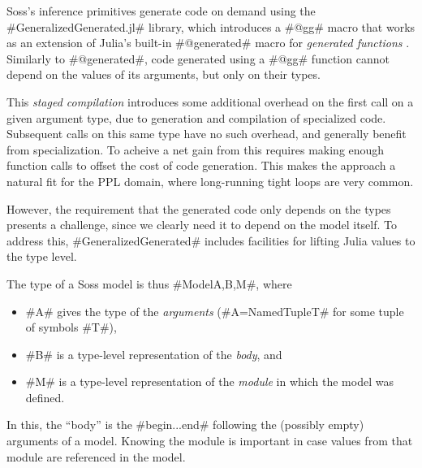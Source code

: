 \documentclass[anonymous=false, %
               format=acmsmall, %
               review=true, %
               screen=true, %
               nonacm=true]{acmart}
\begin{document}
Soss's inference primitives generate code on demand using the \jl#GeneralizedGenerated.jl# library, which introduces a \jl#@gg# macro that works as an extension of Julia's built-in \jl#@generated# macro for \emph{generated functions} \cite{bezanson2012julia}. Similarly to \jl#@generated#, code generated using a \jl#@gg# function cannot depend on the values of its arguments, but only on their types. 

This \emph{staged compilation} introduces some additional overhead on the first call on a given argument type, due to generation and compilation of specialized code. Subsequent calls on this same type have no such overhead, and generally benefit from specialization. To acheive a net gain from this requires making enough function calls to offset the cost of code generation. This makes the approach a natural fit for the PPL domain, where long-running tight loops are very common. 

However, the requirement that the generated code only depends on the types presents a challenge, since we clearly need it to depend on the model itself. To address this, \jl#GeneralizedGenerated# includes facilities for lifting Julia values to the type level. 

The type of a Soss model is thus \jl#Model{A,B,M}#, where 
\begin{itemize}
    \item \jl#A# gives the type of the \emph{arguments} (\jl#A=NamedTuple{T}# for some tuple of symbols \jl#T#),
    \item \jl#B# is a type-level representation of the \emph{body}, and
    \item \jl#M# is a type-level representation of the \emph{module} in which the model was defined.
\end{itemize}

In this, the ``body'' is the \jl#begin...end# following the (possibly empty) arguments of a model. Knowing the module is important in case values from that module are referenced in the model.
\end{document}
